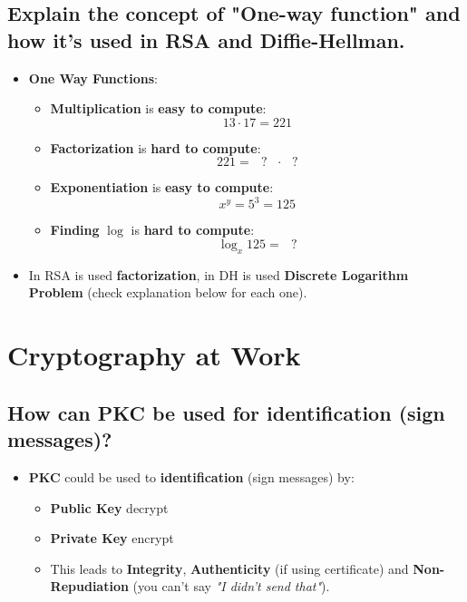 \documentclass[9pt, letterpaper]{article}
\begin{document}
\subsection{Explain the concept of "One-way function" and how it's used in RSA and Diffie-Hellman.}
\begin{itemize}
	\item \textbf{One Way Functions}:
	      \begin{itemize}
		      \item \textbf{Multiplication} is \textbf{easy to compute}: $$ 13\cdot 17 = 221 $$
		      \item \textbf{Factorization} is \textbf{hard to compute}: $$ 221 = \mbox{  } ? \mbox{ }\cdot \mbox{ } ? $$
		      \item \textbf{Exponentiation} is \textbf{easy to compute}: $$ x^y = 5^3 = 125 $$
		      \item \textbf{Finding} $\log$ is \textbf{hard to compute}: $$ \log_x125 = \mbox{ } ? $$
	      \end{itemize}
	\item In RSA is used \textbf{factorization}, in \textsc{DH} is used \textbf{Discrete Logarithm Problem} (check explanation below for each one).
\end{itemize}

\newpage

\section{Cryptography at Work}

\subsection{How can PKC be used for identification (sign messages)?}
\begin{itemize}
	\item \textbf{PKC} could be used to \textbf{identification} (sign messages) by:
	      \begin{itemize}
		      \item \textbf{Public Key} decrypt
		      \item \textbf{Private Key} encrypt
		      \item This leads to \textbf{Integrity}, \textbf{Authenticity} (if using certificate) and \textbf{Non-Repudiation} (you can't say \textit{"I didn't send that"}).
	      \end{itemize}
\end{itemize}
\end{document}
